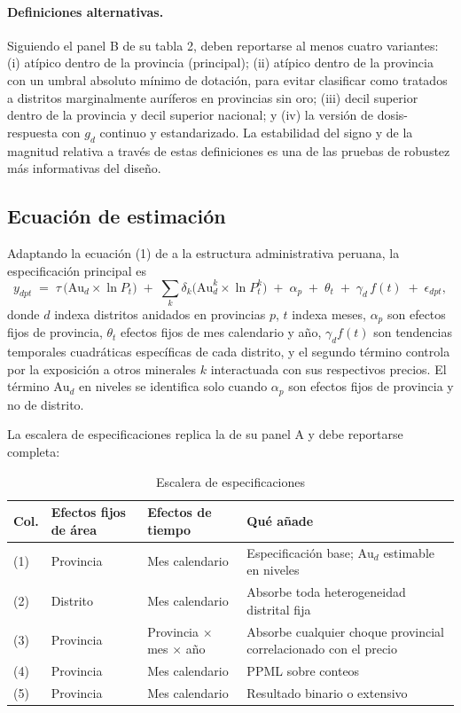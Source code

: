 \documentclass[11pt,a4paper]{article}
\newcommand{\Au}{\mathrm{Au}}
\begin{document}
\paragraph{Definiciones alternativas.} Siguiendo el panel B de su tabla 2, deben reportarse al menos cuatro variantes: (i) atípico dentro de la provincia (principal); (ii) atípico dentro de la provincia con un umbral absoluto mínimo de dotación, para evitar clasificar como tratados a distritos marginalmente auríferos en provincias sin oro; (iii) decil superior dentro de la provincia y decil superior nacional; y (iv) la versión de dosis-respuesta con $g_d$ continuo y estandarizado. La estabilidad del signo y de la magnitud relativa a través de estas definiciones es una de las pruebas de robustez más informativas del diseño.

\subsection{Ecuación de estimación}

Adaptando la ecuación (1) de \citet{braakmann2024} a la estructura administrativa peruana, la especificación principal es
\begin{equation}
y_{dpt} \;=\; \tau \,\bigl(\Au_d \times \ln P_t\bigr) \;+\; \sum_{k}\delta_k\bigl(\Au^k_d \times \ln P^k_t\bigr) \;+\; \alpha_p \;+\; \theta_t \;+\; \gamma_d \, f(t) \;+\; \epsilon_{dpt},
\label{eq:principal}
\end{equation}
donde $d$ indexa distritos anidados en provincias $p$, $t$ indexa meses, $\alpha_p$ son efectos fijos de provincia, $\theta_t$ efectos fijos de mes calendario y año, $\gamma_d f(t)$ son tendencias temporales cuadráticas específicas de cada distrito, y el segundo término controla por la exposición a otros minerales $k$ interactuada con sus respectivos precios. El término $\Au_d$ en niveles se identifica solo cuando $\alpha_p$ son efectos fijos de provincia y no de distrito.

La escalera de especificaciones replica la de su panel A y debe reportarse completa:
\begin{table}[h!]
\centering
\singlespacing
\caption{Escalera de especificaciones}
\label{tab:escalera}
\small
\begin{tabularx}{\textwidth}{L{1.1cm} L{4.0cm} L{3.4cm} X}
\toprule
\textbf{Col.} & \textbf{Efectos fijos de área} & \textbf{Efectos de tiempo} & \textbf{Qué añade} \\
\midrule
(1) & Provincia & Mes calendario & Especificación base; $\Au_d$ estimable en niveles \\
(2) & Distrito & Mes calendario & Absorbe toda heterogeneidad distrital fija \\
(3) & Provincia & Provincia $\times$ mes $\times$ año & Absorbe cualquier choque provincial correlacionado con el precio \\
(4) & Provincia & Mes calendario & PPML sobre conteos \\
(5) & Provincia & Mes calendario & Resultado binario o extensivo \\
\bottomrule
\end{tabularx}
\end{table}
\end{document}

